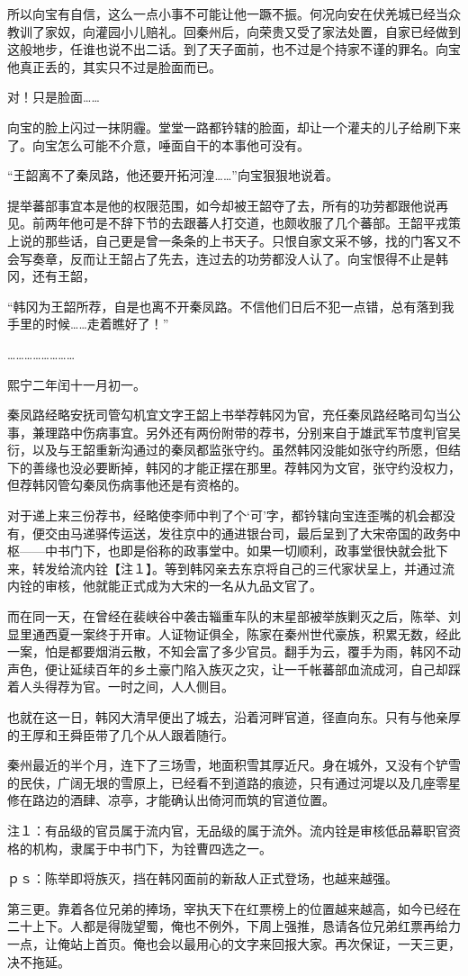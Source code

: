 所以向宝有自信，这么一点小事不可能让他一蹶不振。何况向安在伏羌城已经当众教训了家奴，向灌园小儿赔礼。回秦州后，向荣贵又受了家法处置，自家已经做到这般地步，任谁也说不出二话。到了天子面前，也不过是个持家不谨的罪名。向宝他真正丢的，其实只不过是脸面而已。

对！只是脸面……

向宝的脸上闪过一抹阴霾。堂堂一路都钤辖的脸面，却让一个灌夫的儿子给刷下来了。向宝怎么可能不介意，唾面自干的本事他可没有。

“王韶离不了秦凤路，他还要开拓河湟……”向宝狠狠地说着。

提举蕃部事宜本是他的权限范围，如今却被王韶夺了去，所有的功劳都跟他说再见。前两年他可是不辞下节的去跟蕃人打交道，也颇收服了几个蕃部。王韶平戎策上说的那些话，自己更是曾一条条的上书天子。只恨自家文采不够，找的门客又不会写奏章，反而让王韶占了先去，连过去的功劳都没人认了。向宝恨得不止是韩冈，还有王韶，

“韩冈为王韶所荐，自是也离不开秦凤路。不信他们日后不犯一点错，总有落到我手里的时候……走着瞧好了！”

……………………

熙宁二年闰十一月初一。

秦凤路经略安抚司管勾机宜文字王韶上书举荐韩冈为官，充任秦凤路经略司勾当公事，兼理路中伤病事宜。另外还有两份附带的荐书，分别来自于雄武军节度判官吴衍，以及与王韶重新沟通过的秦凤都监张守约。虽然韩冈没能如张守约所愿，但结下的善缘也没必要断掉，韩冈的才能正摆在那里。荐韩冈为文官，张守约没权力，但荐韩冈管勾秦凤伤病事他还是有资格的。

对于递上来三份荐书，经略使李师中判了个‘可’字，都钤辖向宝连歪嘴的机会都没有，便交由马递驿传运送，发往京中的通进银台司，最后呈到了大宋帝国的政务中枢——中书门下，也即是俗称的政事堂中。如果一切顺利，政事堂很快就会批下来，转发给流内铨【注１】。等到韩冈亲去东京将自己的三代家状呈上，并通过流内铨的审核，他就能正式成为大宋的一名从九品文官了。

而在同一天，在曾经在裴峡谷中袭击辎重车队的末星部被举族剿灭之后，陈举、刘显里通西夏一案终于开审。人证物证俱全，陈家在秦州世代豪族，积累无数，经此一案，怕是都要烟消云散，不知会富了多少官员。翻手为云，覆手为雨，韩冈不动声色，便让延续百年的乡土豪门陷入族灭之灾，让一千帐蕃部血流成河，自己却踩着人头得荐为官。一时之间，人人侧目。

也就在这一日，韩冈大清早便出了城去，沿着河畔官道，径直向东。只有与他亲厚的王厚和王舜臣带了几个从人跟着随行。

秦州最近的半个月，连下了三场雪，地面积雪其厚近尺。身在城外，又没有个铲雪的民伕，广阔无垠的雪原上，已经看不到道路的痕迹，只有通过河堤以及几座零星修在路边的酒肆、凉亭，才能确认出倚河而筑的官道位置。

注１：有品级的官员属于流内官，无品级的属于流外。流内铨是审核低品幕职官资格的机构，隶属于中书门下，为铨曹四选之一。

ｐｓ：陈举即将族灭，挡在韩冈面前的新敌人正式登场，也越来越强。

第三更。靠着各位兄弟的捧场，宰执天下在红票榜上的位置越来越高，如今已经在二十上下。人都是得陇望蜀，俺也不例外，下周上强推，恳请各位兄弟红票再给力一点，让俺站上首页。俺也会以最用心的文字来回报大家。再次保证，一天三更，决不拖延。

